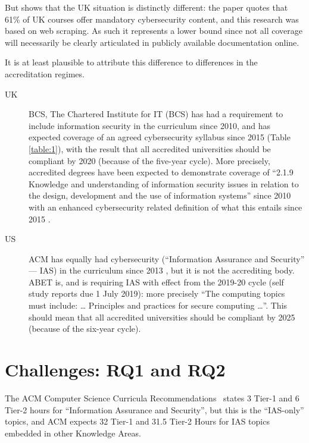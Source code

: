 \documentclass[conference]{IEEEtran}
\begin{document}
But \cite[Table 1]{Ruiz2019a} shows that the UK situation is distinctly different: the paper quotes that 61\% of UK courses offer mandatory cybersecurity content, and this research was based on web scraping. As such it represents a lower bound since not all coverage will necessarily be clearly articulated in publicly available documentation online.

It is at least plausible to attribute this difference to differences in the accreditation regimes.
\begin{description}
\item[UK]BCS, The Chartered Institute for IT (BCS) has had a requirement to include information security in the curriculum since 2010, and has expected coverage of an agreed cybersecurity syllabus since 2015 (Table \ref{table:1}), with the result that all accredited universities should be compliant by 2020 (because of the five-year cycle). More precisely, accredited degrees have been expected to demonstrate coverage of ``2.1.9 Knowledge and understanding of information security issues in relation to the design, development and the use of information  systems'' \cite[p.~30]{BCS2018a} since 2010 with an enhanced cybersecurity related definition of what this entails since 2015 \cite[p.~17--18]{BCS2018a}.
\item[US]ACM has equally had cybersecurity (``Information Assurance and Security'' --- IAS) in the curriculum since 2013 \cite{ACM2013a}, but it is not the accrediting body. ABET is, and is requiring IAS with effect from the 2019-20 cycle (self study reports due 1 July 2019): more precisely \cite[Table 3]{Oudshoornetal2018a} ``The computing topics must include: \dots{} Principles and practices for secure computing \dots''. This should mean that  all accredited universities should be compliant by 2025 (because of the six-year cycle).
\end{description}

\section{Challenges: RQ1 and RQ2}

The ACM Computer Science Curricula Recommendations~\cite{ACM2013a} states 3 Tier-1 and 6 Tier-2 hours for ``Information Assurance and Security'', but this is the ``IAS-only'' topics, and ACM expects 32 Tier-1 and 31.5 Tier-2 Hours for IAS topics embedded in other Knowledge Areas.
\end{document}
